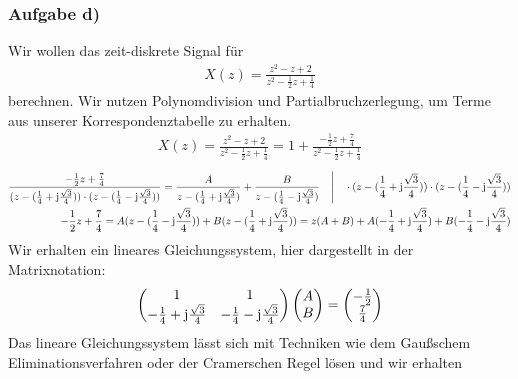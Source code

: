 \subsubsection{Aufgabe d)}
Wir wollen das zeit-diskrete Signal für
\begin{align}
	X(z)=\frac{z^2-z+2}{z^2-\frac{1}{2}z+\frac{1}{4}}
\end{align}
berechnen.
Wir nutzen Polynomdivision und Partialbruchzerlegung, um Terme aus unserer Korrespondenztabelle zu erhalten.
\begin{align}
	X(z)=\frac{z^2-z+2}{z^2-\frac{1}{2}z+\frac{1}{4}}=1+\frac{-\frac{1}{2}z+\frac{7}{4}}{z^2-\frac{1}{2}z+\frac{1}{4}}
\end{align}
\begin{align}
	\label{eq:TaskDPartialFractionDecomposition}
	\frac{-\frac{1}{2}z+\frac{7}{4}}{(z-(\frac{1}{4}+\im\frac{\sqrt{3}}{4}))\cdot(z-(\frac{1}{4}-\im\frac{\sqrt{3}}{4}))}=\frac{A}{z-(\frac{1}{4}+\im\frac{\sqrt{3}}{4})}+\frac{B}{z-(\frac{1}{4}-\im\frac{\sqrt{3}}{4})}\quad\Bigg | \quad \cdot (z-(\frac{1}{4}+\im\frac{\sqrt{3}}{4}))\cdot(z-(\frac{1}{4}-\im\frac{\sqrt{3}}{4}))\nonumber\\
	-\frac{1}{2}z+\frac{7}{4}=A(z-(\frac{1}{4}-\im\frac{\sqrt{3}}{4}))+B(z-(\frac{1}{4}+\im\frac{\sqrt{3}}{4}))=z(A+B)+A(-\frac{1}{4}+\im\frac{\sqrt{3}}{4})+B(-\frac{1}{4}-\im\frac{\sqrt{3}}{4})
\end{align}
Wir erhalten ein lineares Gleichungssystem, hier dargestellt in der Matrixnotation:
\begin{align}
	\begin{pmatrix}
		1 & 1 \\
		-\frac{1}{4}+\im\frac{\sqrt{3}}{4} & -\frac{1}{4}-\im\frac{\sqrt{3}}{4} 
	\end{pmatrix}
	\begin{pmatrix}
		A \\
		B
	\end{pmatrix}
	=
	\begin{pmatrix}
		-\frac{1}{2} \\
		\frac{7}{4}
	\end{pmatrix}
\end{align}
Das lineare Gleichungssystem lässt sich mit Techniken wie dem Gaußschem Eliminationsverfahren oder der Cramerschen Regel lösen und wir erhalten
